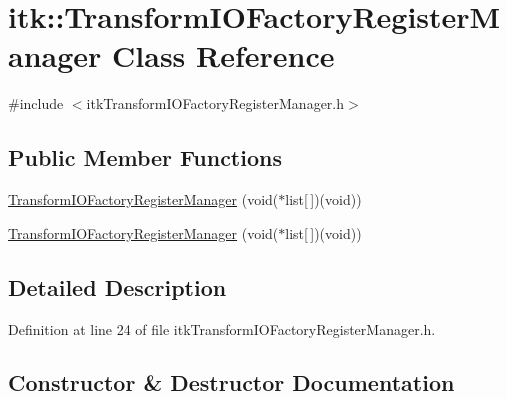 \hypertarget{classitk_1_1_transform_i_o_factory_register_manager}{}\section{itk\+:\+:Transform\+I\+O\+Factory\+Register\+Manager Class Reference}
\label{classitk_1_1_transform_i_o_factory_register_manager}


{\ttfamily \#include $<$itk\+Transform\+I\+O\+Factory\+Register\+Manager.\+h$>$}

\subsection*{Public Member Functions}
\begin{DoxyCompactItemize}
\item 
\hyperlink{classitk_1_1_transform_i_o_factory_register_manager_aefb761ca3bfca773fe91c4861c19e4f8}{Transform\+I\+O\+Factory\+Register\+Manager} (void($\ast$list\mbox{[}$\,$\mbox{]})(void))
\item 
\hyperlink{classitk_1_1_transform_i_o_factory_register_manager_aefb761ca3bfca773fe91c4861c19e4f8}{Transform\+I\+O\+Factory\+Register\+Manager} (void($\ast$list\mbox{[}$\,$\mbox{]})(void))
\end{DoxyCompactItemize}


\subsection{Detailed Description}


Definition at line 24 of file itk\+Transform\+I\+O\+Factory\+Register\+Manager.\+h.



\subsection{Constructor \& Destructor Documentation}
\mbox{\label{classitk_1_1_transform_i_o_factory_register_manager_aefb761ca3bfca773fe91c4861c19e4f8}} 
